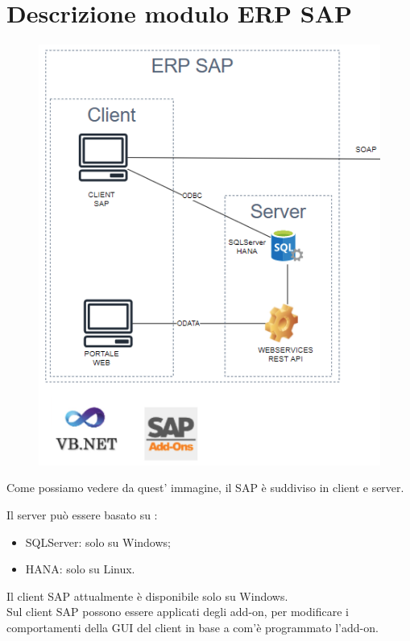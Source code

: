 \section{Descrizione modulo ERP SAP}
\begin{figure}[!h] 
	\centering 
	\includegraphics[scale = 0.9]{immagini/modulo-sap.png} 
\end{figure}
\begin{flushleft}
	\item Come possiamo vedere da quest' immagine, il SAP è suddiviso in client e server.\\
	\item Il server può essere basato su :
	\begin{itemize}
		\item SQLServer: solo su Windows;
		\item HANA: solo su Linux.
	\end{itemize}
	\item Il client SAP attualmente è disponibile solo su Windows.\\Sul client SAP possono essere applicati degli add-on, per modificare i comportamenti della GUI del client in base a com'è programmato l'add-on.
\end{flushleft}

